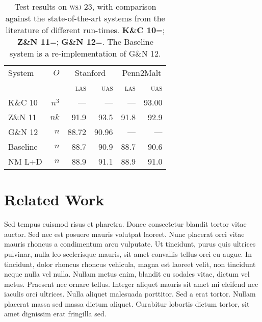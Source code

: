 \documentclass[11pt,letterpaper]{article}
\newcommand{\las}{\textsc{las}\xspace}
\newcommand{\uas}{\textsc{uas}\xspace}
\newcommand{\wsj}{\textsc{wsj}\xspace}
\begin{document}
\begin{table}
    \centering
    \small
    \begin{tabular}{l|r|rr|rr}
        \hline 
System  &   $O$ &  \multicolumn{2}{c}{Stanford} & \multicolumn{2}{|c}{Penn2Malt} \\
        &       &  \las  & \uas  & \las & \uas \\
        \hline \hline
K\&C 10  & $n^3$ & ---   & ---   & ---  & 93.00 \\
Z\&N 11  & $nk$  & 91.9  & 93.5  & 91.8 & 92.9 \\
G\&N 12  & $n$   & 88.72 & 90.96 & ---  & --- \\
        \hline
Baseline    & $n$ & 88.7 & 90.9 & 88.7  & 90.6 \\
NM L+D      & $n$ & 88.9 & 91.1 & 88.9  & 91.0 \\
\hline
    \end{tabular}
    \caption{\small Test results on \wsj 23, with comparison against the
        state-of-the-art systems from the literature of different run-times.
        \textbf{K\&C 10}=\citet{koo:10}; \textbf{Z\&N 11}=\citet{zhang:11};
        \textbf{G\&N 12}=\citet{goldberg:12}. The Baseline system is a re-implementation
             of G\&N 12.\label{tab:eval}}
\end{table}

\section{Related Work}


Sed tempus euismod risus et pharetra. Donec consectetur blandit tortor vitae auctor. Sed nec est posuere mauris volutpat laoreet. Nunc placerat orci vitae mauris rhoncus a condimentum arcu vulputate. Ut tincidunt, purus quis ultrices pulvinar, nulla leo scelerisque mauris, sit amet convallis tellus orci eu augue. In tincidunt, dolor rhoncus rhoncus vehicula, magna est laoreet velit, non tincidunt neque nulla vel nulla. Nullam metus enim, blandit eu sodales vitae, dictum vel metus. Praesent nec ornare tellus. Integer aliquet mauris sit amet mi eleifend nec iaculis orci ultrices. Nulla aliquet malesuada porttitor. Sed a erat tortor. Nullam placerat massa sed massa dictum aliquet. Curabitur lobortis dictum tortor, sit amet dignissim erat fringilla sed.
\end{document}

